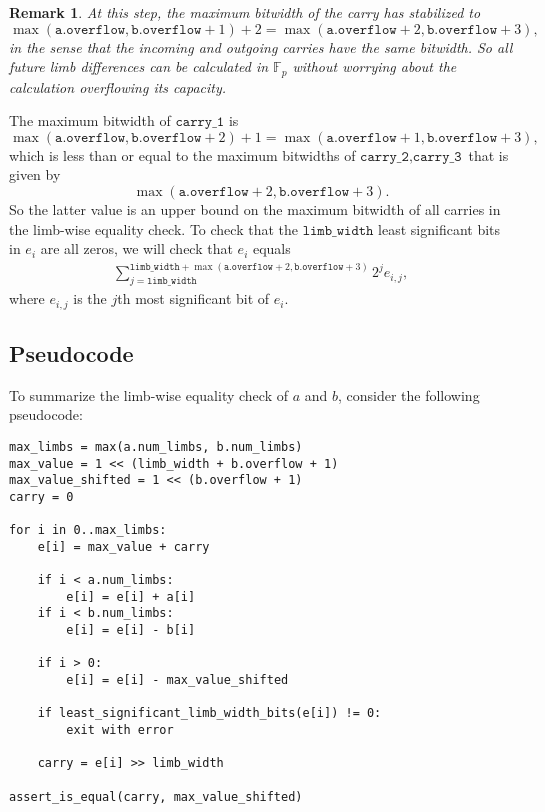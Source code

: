 \documentclass[a4paper, 12pt]{article}
\newtheorem*{remark}{Remark}
\begin{document}
    \begin{remark}
    At this step, the maximum bitwidth of the carry has stabilized to $$\max(\texttt{a.overflow}, \texttt{b.overflow} + 1) + 2 = \max(\texttt{a.overflow} + 2, \texttt{b.overflow} + 3),$$ in the sense that the incoming and outgoing carries have the same bitwidth. So all future limb differences can be calculated in $\mathbb{F}_p$ without worrying about the calculation overflowing its capacity.
    \end{remark}

    The maximum bitwidth of  $\texttt{carry\_1}$ is
$$\max(\texttt{a.overflow}, \texttt{b.overflow} + 2) + 1 = \max(\texttt{a.overflow} + 1, \texttt{b.overflow} + 3),$$
which is less than or equal to the maximum bitwidths of $\texttt{carry\_2}, \texttt{carry\_3}$ that is given by $$\max(\texttt{a.overflow} + 2, \texttt{b.overflow} + 3).$$
So the latter value is an upper bound on the maximum bitwidth of all carries in the limb-wise equality check. To check that the $\texttt{limb\_width}$ least significant bits in $e_i$ are all zeros, we will check that $e_i$ equals
\begin{align*}
\sum^{\texttt{limb\_width}+\max(\texttt{a.overflow} + 2, \texttt{b.overflow} + 3)}_{j=\texttt{limb\_width}} 2^j e_{i,j},
\end{align*}
where $e_{i,j}$ is the $j$th most significant bit of $e_i$.

\subsection{Pseudocode}%
\label{sec:pseudocode}
To summarize the limb-wise equality check of $a$ and $b$, consider the following pseudocode:

\begin{verbatim}
max_limbs = max(a.num_limbs, b.num_limbs)
max_value = 1 << (limb_width + b.overflow + 1)
max_value_shifted = 1 << (b.overflow + 1)
carry = 0

for i in 0..max_limbs:
    e[i] = max_value + carry

    if i < a.num_limbs:
        e[i] = e[i] + a[i]
    if i < b.num_limbs:
        e[i] = e[i] - b[i]

    if i > 0:
        e[i] = e[i] - max_value_shifted
    
    if least_significant_limb_width_bits(e[i]) != 0:
        exit with error

    carry = e[i] >> limb_width

assert_is_equal(carry, max_value_shifted)
\end{verbatim}
\end{document}
